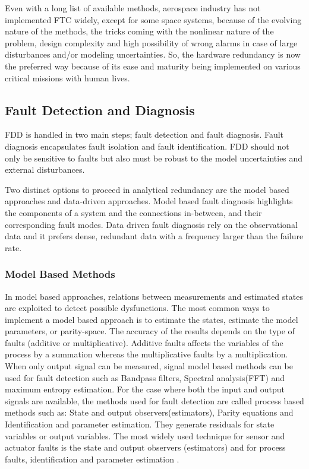Even with a long list of available methods, aerospace industry has not implemented 
FTC widely, except for some space systems, because of the evolving nature of the methods, 
the tricks coming with the nonlinear nature of the problem, design complexity and high 
possibility of wrong alarms in case of large disturbances and/or modeling uncertainties. 
So, the hardware redundancy is now the preferred way because of its ease and maturity being implemented on various critical missions with human lives.

\subsection{Fault Detection and Diagnosis}

FDD is handled in two main steps; fault detection and fault diagnosis. Fault diagnosis 
encapsulates fault isolation and fault identification. FDD should 
not only be sensitive to faults but also must be robust to the model uncertainties and 
external disturbances.

Two distinct options to proceed in analytical redundancy are the model based 
approaches and data-driven approaches.
Model based fault diagnosis highlights the components of a system and the connections 
in-between, and their corresponding fault modes. 
Data driven fault diagnosis rely on the observational data and it prefers dense, redundant data with a frequency larger than the failure rate. 

%

\subsubsection{Model Based Methods}

In model based approaches, relations between measurements and estimated 
states are exploited to detect possible dysfunctions. The most common ways to 
implement a model based approach is to estimate the states, estimate the model 
parameters, or parity-space. The accuracy of the results depends on the type of 
faults (additive or multiplicative). Additive faults affects the variables of the process 
by a summation whereas the multiplicative faults by a multiplication.  When only 
output signal can be measured, signal model based methods can be used for 
fault detection such as Bandpass filters, Spectral analysis(FFT) and maximum entropy estimation. 
For the case where both the input and output signals are available, the methods used 
for fault detection are called process based methods such as: State and output 
observers(estimators), Parity equations and Identification and parameter estimation. 
They generate residuals for state variables or output variables. 
The most widely used technique for sensor and actuator faults is the state and output observers (estimators) and for process faults, identification and parameter estimation \cite{isermann1997trends}.

